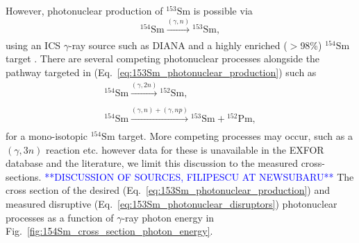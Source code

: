 \documentclass[../main.tex]{subfiles}
\begin{document}
However, photonuclear production of $^{153}\mathrm{Sm}$ \cite{carlos1974giant,filipescu2014photoneutron} is possible via
\begin{equation}
^{154}\mathrm{Sm}\xrightarrow[]{\left(\gamma,n\right)}{}^{153}\mathrm{Sm},
\label{eq:153Sm_photonuclear_production}    
\end{equation}
using an ICS $\gamma$-ray source such as DIANA and a highly enriched ($>$98\%) $^{154}\mathrm{Sm}$ target \cite{bell1987stable,isoflex2021sm}. There are several competing photonuclear processes alongside the pathway targeted in (Eq.~\ref{eq:153Sm_photonuclear_production}) such as \cite{carlos1974giant}
\begin{align}
^{154}\mathrm{Sm}\xrightarrow[]{\left(\gamma,2n\right)}{}^{152}\mathrm{Sm},\\
^{154}\mathrm{Sm}\xrightarrow[]{\left(\gamma,n\right)+\left(\gamma,np\right)}{}^{153}\mathrm{Sm}+{}^{152}\mathrm{Pm},
\label{eq:153Sm_photonuclear_disruptors}    
\end{align}
for a mono-isotopic $^{154}\mathrm{Sm}$ target. More competing processes may occur, such as a $\left(\gamma,3n\right)$ reaction etc. however data for these is unavailable in the EXFOR database \cite{zerkin2018experimental} and the literature, we limit this discussion to the measured cross-sections. \textcolor{blue}{**DISCUSSION OF SOURCES, FILIPESCU AT NEWSUBARU**} The cross section of the desired (Eq.~\ref{eq:153Sm_photonuclear_production}) and measured disruptive (Eq.~\ref{eq:153Sm_photonuclear_disruptors}) photonuclear processes as a function of $\gamma$-ray photon energy in Fig.~\ref{fig:154Sm_cross_section_photon_energy}.
\end{document}
